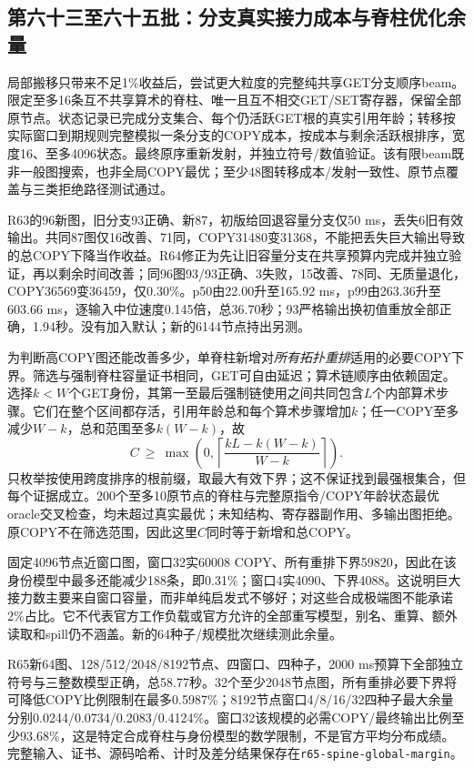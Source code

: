 \documentclass[UTF8,11pt,fontset=fandol]{ctexart}
\begin{document}
\subsection{第六十三至六十五批：分支真实接力成本与脊柱优化余量}
局部搬移只带来不足1\%收益后，尝试更大粒度的完整纯共享GET分支顺序beam。限定至多16条互不共享算术的脊柱、唯一且互不相交GET/SET寄存器，保留全部原节点。状态记录已完成分支集合、每个仍活跃GET根的真实引用年龄；转移按实际窗口到期规则完整模拟一条分支的COPY成本，按成本与剩余活跃根排序，宽度16、至多4096状态。最终原序重新发射，并独立符号/数值验证。该有限beam既非一般图搜索，也非全局COPY最优；至少48图转移成本/发射一致性、原节点覆盖与三类拒绝路径测试通过。

R63的96新图，旧分支93正确、新87，初版给回退容量分支仅50 ms，丢失6旧有效输出。共同87图仅16改善、71同，COPY31480变31368，不能把丢失巨大输出导致的总COPY下降当作收益。R64修正为先让旧容量分支在共享预算内完成并独立验证，再以剩余时间改善；同96图93/93正确、3失败，15改善、78同、无质量退化，COPY36569变36459，仅0.30\%。p50由22.00升至165.92 ms，p99由263.36升至603.66 ms，逐输入中位速度0.145倍，总36.70秒；93严格输出换初值重放全部正确，1.94秒。没有加入默认；新的6144节点持出另测。

为判断高COPY图还能改善多少，单脊柱新增对\emph{所有拓扑重排}适用的必要COPY下界。筛选与强制脊柱容量证书相同，GET可自由延迟；算术链顺序由依赖固定。选择$k<W$个GET身份，其第一至最后强制链使用之间共同包含$L$个内部算术步骤。它们在整个区间都存活，引用年龄总和每个算术步骤增加$k$；任一COPY至多减少$W-k$，总和范围至多$k(W-k)$，故
\[
 C\ \geq\ \max\left(0,\left\lceil\frac{kL-k(W-k)}{W-k}\right\rceil\right).
\]
只枚举按使用跨度排序的根前缀，取最大有效下界；这不保证找到最强根集合，但每个证据成立。200个至多10原节点的脊柱与完整原指令/COPY年龄状态最优oracle交叉检查，均未超过真实最优；未知结构、寄存器副作用、多输出图拒绝。原COPY不在筛选范围，因此这里$C$同时等于新增和总COPY。

固定4096节点近窗口图，窗口32实60008 COPY、所有重排下界59820，因此在该身份模型中最多还能减少188条，即0.31\%；窗口4实4090、下界4088。这说明巨大接力数主要来自窗口容量，而非单纯启发式不够好；对这些合成极端图不能承诺2\%占比。它不代表官方工作负载或官方允许的全部重写模型，别名、重算、额外读取和spill仍不涵盖。新的64种子/规模批次继续测此余量。

R65新64图、128/512/2048/8192节点、四窗口、四种子，2000 ms预算下全部独立符号与三整数模型正确，总58.77秒。32个至少2048节点图，所有重排必要下界将可降低COPY比例限制在最多0.5987\%；8192节点窗口4/8/16/32四种子最大余量分别0.0244/0.0734/0.2083/0.4124\%。窗口32该规模的必需COPY/最终输出比例至少93.68\%，这是特定合成脊柱与身份模型的数学限制，不是官方平均分布成绩。完整输入、证书、源码哈希、计时及差分结果保存在\texttt{r65-spine-global-margin}。
\end{document}
